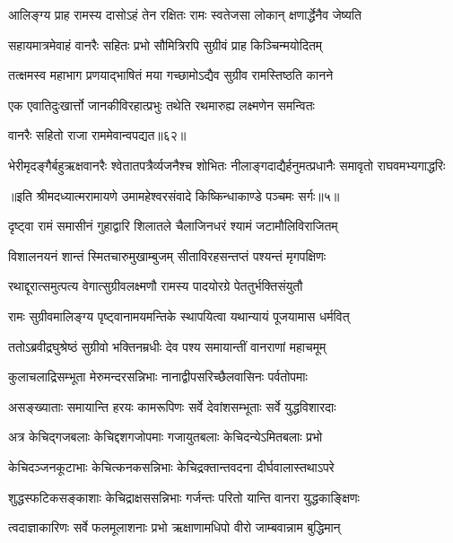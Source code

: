 \twolineshloka
{आलिङ्ग्य प्राह रामस्य दासोऽहं तेन रक्षितः}
{रामः स्वतेजसा लोकान् क्षणार्द्धेनैव जेष्यति} %

\twolineshloka
{सहायमात्रमेवाहं वानरैः सहितः प्रभो}
{सौमित्रिरपि सुग्रीवं प्राह किञ्चिन्मयोदितम्} %

\twolineshloka
{तत्क्षमस्व महाभाग प्रणयाद्भाषितं मया}
{गच्छामोऽद्यैव सुग्रीव रामस्तिष्ठति कानने} %

\twolineshloka
{एक एवातिदुःखार्त्तो जानकीविरहात्प्रभुः}
{तथेति रथमारुह्य लक्ष्मणेन समन्वितः} %

{वानरैः सहितो राजा राममेवान्वपद्यत॥६२॥} %


\twolineshloka
{भेरीमृदङ्गैर्बहुऋक्षवानरैः श्वेतातपत्रैर्व्यजनैश्च शोभितः}
{नीलाङ्गदाद्यैर्हनुमत्प्रधानैः समावृतो राघवमभ्यगाद्धरिः} %

{॥इति श्रीमदध्यात्मरामायणे उमामहेश्वरसंवादे किष्किन्धाकाण्डे
पञ्चमः सर्गः॥५॥
}




\twolineshloka
{दृष्ट्वा रामं समासीनं गुहाद्वारि शिलातले}
{चैलाजिनधरं श्यामं जटामौलिविराजितम्} %

\twolineshloka
{विशालनयनं शान्तं स्मितचारुमुखाम्बुजम्}
{सीताविरहसन्तप्तं पश्यन्तं मृगपक्षिणः} %

\twolineshloka
{रथाद्दूरात्समुत्पत्य वेगात्सुग्रीवलक्ष्मणौ}
{रामस्य पादयोरग्रे पेततुर्भक्तिसंयुतौ} %

\twolineshloka
{रामः सुग्रीवमालिङ्ग्य पृष्ट्वानामयमन्तिके}
{स्थापयित्वा यथान्यायं पूजयामास धर्मवित्} %

\twolineshloka
{ततोऽब्रवीद्रघुश्रेष्ठं सुग्रीवो भक्तिनम्रधीः}
{देव पश्य समायान्तीं वानराणां महाचमूम्} %

\twolineshloka
{कुलाचलाद्रिसम्भूता मेरुमन्दरसन्निभाः}
{नानाद्वीपसरिच्छैलवासिनः पर्वतोपमाः} %

\twolineshloka
{असङ्ख्याताः समायान्ति हरयः कामरूपिणः}
{सर्वे देवांशसम्भूताः सर्वे युद्धविशारदाः} %

\twolineshloka
{अत्र केचिद्गजबलाः केचिद्दशगजोपमाः}
{गजायुतबलाः केचिदन्येऽमितबलाः प्रभो} %

\twolineshloka
{केचिदञ्जनकूटाभाः केचित्कनकसन्निभाः}
{केचिद्रक्तान्तवदना दीर्घवालास्तथाऽपरे} %

\twolineshloka
{शुद्धस्फटिकसङ्काशाः केचिद्राक्षससन्निभाः}
{गर्जन्तः परितो यान्ति वानरा युद्धकाङ्क्षिणः} %

\twolineshloka
{त्वदाज्ञाकारिणः सर्वे फलमूलाशनाः प्रभो}
{ऋक्षाणामधिपो वीरो जाम्बवान्नाम बुद्धिमान्} %

